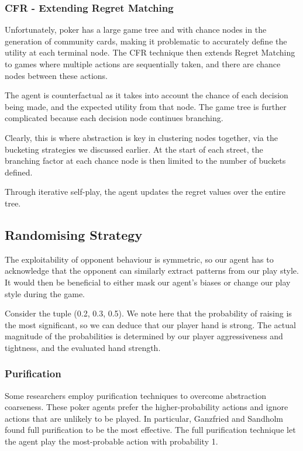 \documentclass{article}
\begin{document}
\subsubsection{CFR - Extending Regret Matching}

Unfortunately, poker has a large game tree and with chance nodes in the generation of community cards, making it problematic to accurately define the utility at each terminal node. The CFR technique then extends Regret Matching to games where multiple actions are sequentially taken, and there are chance nodes between these actions.

The agent is counterfactual as it takes into account the chance of each decision being made, and the expected utility from that node. The game tree is further complicated because each decision node continues branching. 

Clearly, this is where abstraction is key in clustering nodes together, via the bucketing strategies we discussed earlier. At the start of each street, the branching factor at each chance node is then limited to the number of buckets defined.

Through iterative self-play, the agent updates the regret values over the entire tree.

\subsection{Randomising Strategy}

The exploitability of opponent behaviour is symmetric, so our agent has to acknowledge that the opponent can similarly extract patterns from our play style. It would then be beneficial to either mask our agent's biases or change our play style during the game.

Consider the tuple (0.2, 0.3, 0.5). We note here that the probability of raising is the most significant, so we can deduce that our player hand is strong. The actual magnitude of the probabilities is determined by our player aggressiveness and tightness, and the evaluated hand strength.

\subsubsection{Purification}

Some researchers employ purification techniques to overcome abstraction coarseness. These poker agents prefer the higher-probability actions and ignore actions that are unlikely to be played. In particular, Ganzfried and Sandholm found full purification to be the most effective. The full purification technique let the agent play the most-probable action with probability 1.
\end{document}
